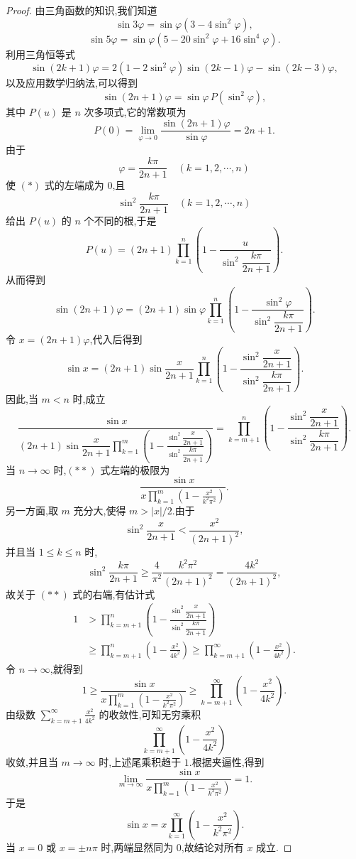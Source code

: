\begin{proof}
	由三角函数的知识,我们知道
	\[
	\sin 3\varphi=\sin\varphi\left(3-4\sin^2\varphi\right),
	\]
	\[
	\sin 5\varphi=\sin\varphi\left(5-20\sin^2\varphi+16\sin^4\varphi\right).
	\]
	利用三角恒等式
	\[
	\sin(2k+1)\varphi
	=2(1-2\sin^2\varphi)\sin(2k-1)\varphi-\sin(2k-3)\varphi,
	\]
	以及应用数学归纳法,可以得到
	\[
	\sin(2n+1)\varphi=\sin\varphi\,P(\sin^2\varphi),
	\tag{*}
	\]
	其中 $P(u)$ 是 $n$ 次多项式,它的常数项为
	\[
	P(0)=\lim_{\varphi\to0}\frac{\sin(2n+1)\varphi}{\sin\varphi}=2n+1.
	\]
	由于
	\[
	\varphi=\frac{k\pi}{2n+1}\quad(k=1,2,\cdots,n)
	\]
	使 $(*)$ 式的左端成为 $0$,且
	\[
	\sin^2\frac{k\pi}{2n+1}\quad(k=1,2,\cdots,n)
	\]
	给出 $P(u)$ 的 $n$ 个不同的根,于是
	\[
	P(u)=(2n+1)\prod_{k=1}^{n}
	\left(1-\frac{u}{\sin^2\dfrac{k\pi}{2n+1}}\right).
	\]
	从而得到
	\[
	\sin(2n+1)\varphi
	=(2n+1)\sin\varphi\prod_{k=1}^{n}
	\left(1-\frac{\sin^2\varphi}{\sin^2\dfrac{k\pi}{2n+1}}\right).
	\]
	令 $x=(2n+1)\varphi$,代入后得到
	\[
	\sin x
	=(2n+1)\sin\frac{x}{2n+1}\prod_{k=1}^{n}
	\left(1-\frac{\sin^2\dfrac{x}{2n+1}}{\sin^2\dfrac{k\pi}{2n+1}}\right).
	\]
	因此,当 $m<n$ 时,成立
	\[
	\frac{\sin x}
	{(2n+1)\sin\dfrac{x}{2n+1}
		\displaystyle\prod_{k=1}^{m}
		\left(1-\frac{\sin^2\dfrac{x}{2n+1}}{\sin^2\dfrac{k\pi}{2n+1}}\right)}
	=
	\prod_{k=m+1}^{n}
	\left(1-\frac{\sin^2\dfrac{x}{2n+1}}{\sin^2\dfrac{k\pi}{2n+1}}\right).
	\tag{**}
	\]
	当 $n\to\infty$ 时,$(**)$ 式左端的极限为
	\[
	\frac{\sin x}{x\displaystyle\prod_{k=1}^{m}
		\left(1-\frac{x^2}{k^2\pi^2}\right)}.
	\]
	另一方面,取 $m$ 充分大,使得 $m>|x|/2$.由于
	\[
	\sin^2\frac{x}{2n+1}<\frac{x^2}{(2n+1)^2},
	\]
	并且当 $1\leq k\leq n$ 时,
	\[
	\sin^2\frac{k\pi}{2n+1}
	\geq \frac{4}{\pi^2}\frac{k^2\pi^2}{(2n+1)^2}
	=\frac{4k^2}{(2n+1)^2},
	\]
	故关于 $(**)$ 式的右端,有估计式
	\[
	\begin{aligned}
		1
		&>\prod_{k=m+1}^{n}
		\left(1-\frac{\sin^2\dfrac{x}{2n+1}}{\sin^2\dfrac{k\pi}{2n+1}}\right) \\
		&\geq \prod_{k=m+1}^{n}\left(1-\frac{x^2}{4k^2}\right)
		\geq \prod_{k=m+1}^{\infty}\left(1-\frac{x^2}{4k^2}\right).
	\end{aligned}
	\]
	令 $n\to\infty$,就得到
	\[
	1\geq
	\frac{\sin x}{x\displaystyle\prod_{k=1}^{m}
		\left(1-\frac{x^2}{k^2\pi^2}\right)}
	\geq
	\prod_{k=m+1}^{\infty}\left(1-\frac{x^2}{4k^2}\right).
	\]
	由级数 $\displaystyle\sum_{k=m+1}^{\infty}\frac{x^2}{4k^2}$ 的收敛性,可知无穷乘积
	\[
	\prod_{k=m+1}^{\infty}\left(1-\frac{x^2}{4k^2}\right)
	\]
	收敛,并且当 $m\to\infty$ 时,上述尾乘积趋于 $1$.根据夹逼性,得到
	\[
	\lim_{m\to\infty}
	\frac{\sin x}{x\displaystyle\prod_{k=1}^{m}
		\left(1-\frac{x^2}{k^2\pi^2}\right)}=1.
	\]
	于是
	\[
	\sin x=x\prod_{k=1}^{\infty}\left(1-\frac{x^2}{k^2\pi^2}\right).
	\]
	当 $x=0$ 或 $x=\pm n\pi$ 时,两端显然同为 $0$,故结论对所有 $x$ 成立.
\end{proof}






